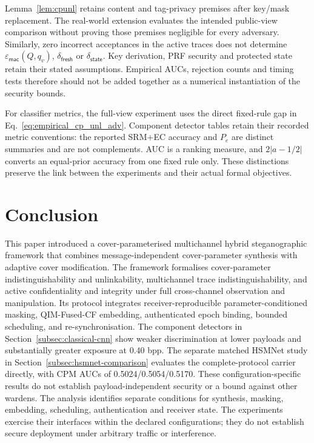 \documentclass[pdflatex,sn-mathphys-num]{sn-jnl}%
\theoremstyle{definition}
\theoremstyle{game}
\theoremstyle{thmstyleone}%
\theoremstyle{thmstyletwo}%
\theoremstyle{thmstylethree}%
\begin{document}
Lemma~\ref{lem:cpunl} retains content and tag-privacy premises after
key/mask replacement. The real-world extension evaluates the intended
public-view comparison without proving those premises negligible for
every adversary. Similarly, zero incorrect acceptances in the active
traces does not determine $\varepsilon_{\mathsf{mac}}(Q,q_v)$,
$\delta_{\mathsf{fresh}}$ or $\delta_{\mathsf{state}}$. Key derivation,
PRF security and protected state retain their stated assumptions.
Empirical AUCs, rejection counts and timing tests therefore should not
be added together as a numerical instantiation of the security bounds.

For classifier metrics, the full-view experiment uses the direct
fixed-rule gap in Eq.~\eqref{eq:empirical_cp_unl_adv}. Component detector
tables retain their recorded metric conventions: the reported SRM+EC
accuracy and $P_e$ are distinct summaries and are not complements.
AUC is a ranking measure, and $2|a-1/2|$ converts an equal-prior
accuracy from one fixed rule only. These distinctions preserve the
link between the experiments and their actual formal objectives.


\section{Conclusion}
\label{sec:conclusion}

This paper introduced a cover-parameterised multichannel hybrid
steganographic framework that combines message-independent
cover-parameter synthesis with adaptive cover modification. The
framework formalises cover-parameter indistinguishability and
unlinkability, multichannel trace indistinguishability, and active
confidentiality and integrity under full cross-channel observation
and manipulation. Its protocol integrates receiver-reproducible
parameter-conditioned masking, QIM-Fused-CF embedding,
authenticated epoch binding, bounded scheduling, and
re-synchronisation. The component detectors in
Section~\ref{subsec:classical-cnn} show weaker discrimination at lower
payloads and substantially greater exposure at 0.40 bpp. The separate
matched HSMNet study in Section~\ref{subsec:hsmnet-comparison} evaluates
the complete-protocol carrier directly, with CPM AUCs of 0.5024/0.5054/0.5170.
These configuration-specific results do not establish payload-independent
security or a bound against other wardens.
The analysis identifies separate conditions for synthesis, masking,
embedding, scheduling, authentication and receiver state. The experiments
exercise their interfaces within the declared configurations; they do not
establish secure deployment under arbitrary traffic or interference.
\end{document}
